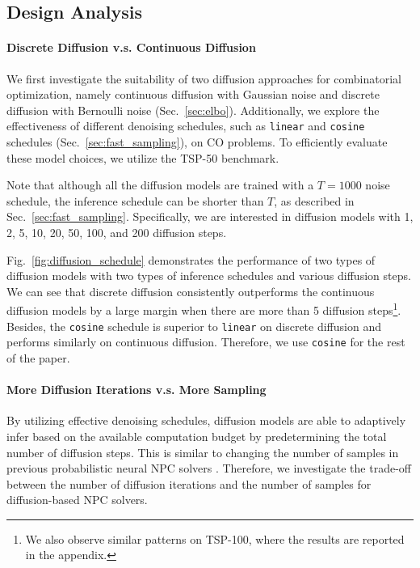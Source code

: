 \documentclass{article}
\theoremstyle{plain}
\theoremstyle{definition}
\theoremstyle{remark}
\begin{document}
\subsection{Design Analysis}

\paragraph{Discrete Diffusion v.s. Continuous Diffusion}

We first investigate the suitability of two diffusion approaches for combinatorial optimization, namely continuous diffusion with Gaussian noise and discrete diffusion with Bernoulli noise (Sec.~\ref{sec:elbo}). Additionally, we explore the effectiveness of different denoising schedules, such as \texttt{linear} and \texttt{cosine} schedules (Sec.~\ref{sec:fast_sampling}), on CO problems. To efficiently evaluate these model choices, we utilize the TSP-50 benchmark.

Note that although all the diffusion models are trained with a $T=1000$ noise schedule, the inference schedule can be shorter than $T$, as described in Sec.~\ref{sec:fast_sampling}. Specifically, we are interested in diffusion models with 1, 2, 5, 10, 20, 50, 100, and 200 diffusion steps.

Fig.~\ref{fig:diffusion_schedule} demonstrates the performance of two types of diffusion models with two types of inference schedules and various diffusion steps. We can see that discrete diffusion consistently outperforms the continuous diffusion models by a large margin when there are more than 5 diffusion steps\footnote{We also observe similar patterns on TSP-100, where the results are reported in the appendix.}.
Besides, the \texttt{cosine} schedule is superior to \texttt{linear} on discrete diffusion and performs similarly on continuous diffusion. Therefore, we use \texttt{cosine} for the rest of the paper.

\paragraph{More Diffusion Iterations v.s. More Sampling}

By utilizing effective denoising schedules, diffusion models are able to adaptively infer based on the available computation budget by predetermining the total number of diffusion steps. This is similar to changing the number of samples in previous probabilistic neural NPC solvers \citep{19iclr-am}. Therefore, we investigate the trade-off between the number of diffusion iterations and the number of samples for diffusion-based NPC solvers.
\end{document}
